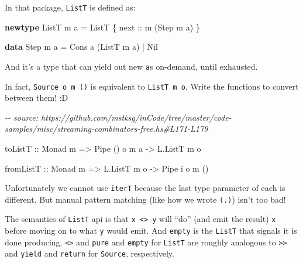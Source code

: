 \documentclass[]{article}
\newenvironment{Shaded}{}{}
\newcommand{\CommentTok}[1]{\textcolor[rgb]{0.38,0.63,0.69}{\textit{#1}}}
\newcommand{\DataTypeTok}[1]{\textcolor[rgb]{0.56,0.13,0.00}{#1}}
\newcommand{\KeywordTok}[1]{\textcolor[rgb]{0.00,0.44,0.13}{\textbf{#1}}}
\newcommand{\NormalTok}[1]{#1}
\newcommand{\OperatorTok}[1]{\textcolor[rgb]{0.40,0.40,0.40}{#1}}
\newcommand{\OtherTok}[1]{\textcolor[rgb]{0.00,0.44,0.13}{#1}}
\begin{document}
\begin{enumerate}
  In that package, \texttt{ListT} is defined as:

\begin{Shaded}
\begin{Highlighting}[]
\KeywordTok{newtype} \DataTypeTok{ListT}\NormalTok{ m a }\OtherTok{=} \DataTypeTok{ListT}\NormalTok{ \{}\OtherTok{ next ::}\NormalTok{ m (}\DataTypeTok{Step}\NormalTok{ m a) \}}

\KeywordTok{data} \DataTypeTok{Step}\NormalTok{ m a }\OtherTok{=} \DataTypeTok{Cons}\NormalTok{ a (}\DataTypeTok{ListT}\NormalTok{ m a) }\OperatorTok{|} \DataTypeTok{Nil}
\end{Highlighting}
\end{Shaded}

  And it's a type that can yield out new \texttt{a}s on-demand, until exhausted.

  In fact, \texttt{Source\ o\ m\ ()} is equivalent to \texttt{ListT\ m\ o}.
  Write the functions to convert between them! :D

\begin{Shaded}
\begin{Highlighting}[]
\CommentTok{{-}{-} source: https://github.com/mstksg/inCode/tree/master/code{-}samples/misc/streaming{-}combinators{-}free.hs\#L171{-}L179}

\OtherTok{toListT ::} \DataTypeTok{Monad}\NormalTok{ m }\OtherTok{=\textgreater{}} \DataTypeTok{Pipe}\NormalTok{ () o m a }\OtherTok{{-}\textgreater{}} \DataTypeTok{L.ListT}\NormalTok{ m o}

\OtherTok{fromListT ::} \DataTypeTok{Monad}\NormalTok{ m }\OtherTok{=\textgreater{}} \DataTypeTok{L.ListT}\NormalTok{ m o }\OtherTok{{-}\textgreater{}} \DataTypeTok{Pipe}\NormalTok{ i o m ()}
\end{Highlighting}
\end{Shaded}

  Unfortunately we cannot use \texttt{iterT} because the last type parameter of
  each is different. But manual pattern matching (like how we wrote
  \texttt{(.\textbar{})}) isn't too bad!

  The semantics of \texttt{ListT} api is that
  \texttt{x\ \textless{}\textbar{}\textgreater{}\ y} will ``do'' (and emit the
  result) \texttt{x} before moving on to what \texttt{y} would emit. And
  \texttt{empty} is the \texttt{ListT} that signals it is done producing.
  \texttt{\textless{}\textbar{}\textgreater{}} and \texttt{pure} and
  \texttt{empty} for \texttt{ListT} are roughly analogous to
  \texttt{\textgreater{}\textgreater{}} and \texttt{yield} and \texttt{return}
  for \texttt{Source}, respectively.
\end{enumerate}
\end{document}
